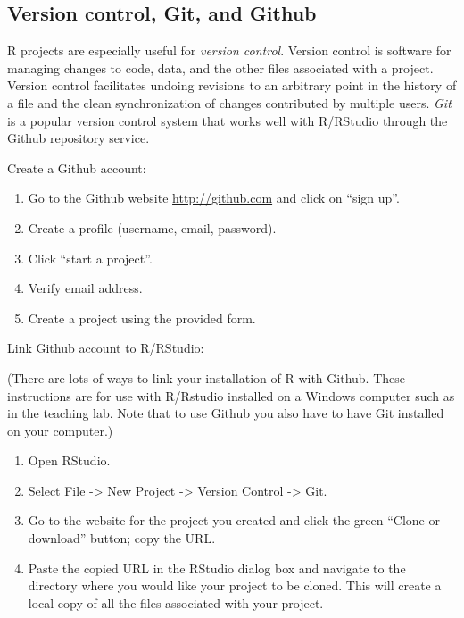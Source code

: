 \documentclass[]{article}
\providecommand{\tightlist}{%
  \setlength{\itemsep}{0pt}\setlength{\parskip}{0pt}}
\begin{document}
\hypertarget{version-control-git-and-github}{%
\subsection{Version control, Git, and
Github}\label{version-control-git-and-github}}

R projects are especially useful for \emph{version control}. Version
control is software for managing changes to code, data, and the other
files associated with a project. Version control facilitates undoing
revisions to an arbitrary point in the history of a file and the clean
synchronization of changes contributed by multiple users. \emph{Git} is
a popular version control system that works well with R/RStudio through
the Github repository service.

Create a Github account:

\begin{enumerate}
\def\labelenumi{\arabic{enumi}.}
\tightlist
\item
  Go to the Github website \url{http://github.com} and click on ``sign
  up''.
\item
  Create a profile (username, email, password).
\item
  Click ``start a project''.
\item
  Verify email address.
\item
  Create a project using the provided form.
\end{enumerate}

Link Github account to R/RStudio:

(There are lots of ways to link your installation of R with Github.
These instructions are for use with R/Rstudio installed on a Windows
computer such as in the teaching lab. Note that to use Github you also
have to have Git installed on your computer.)

\begin{enumerate}
\def\labelenumi{\arabic{enumi}.}
\tightlist
\item
  Open RStudio.
\item
  Select File -\textgreater{} New Project -\textgreater{} Version
  Control -\textgreater{} Git.
\item
  Go to the website for the project you created and click the green
  ``Clone or download'' button; copy the URL.
\item
  Paste the copied URL in the RStudio dialog box and navigate to the
  directory where you would like your project to be cloned. This will
  create a local copy of all the files associated with your project.
\end{enumerate}
\end{document}
